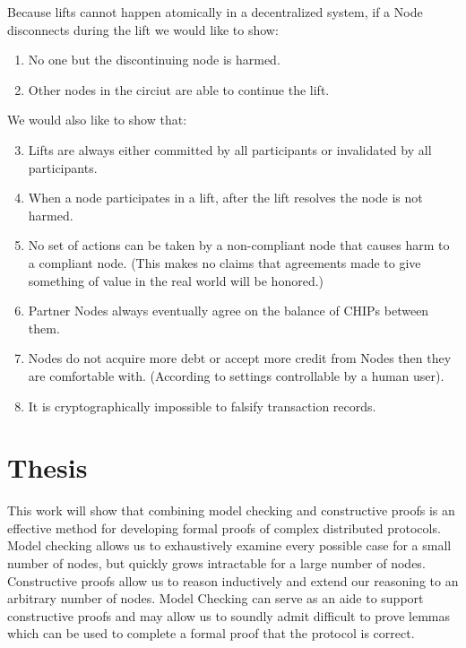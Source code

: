 \documentclass[article, onecolumn, 12pt]{IEEEtran}
\begin{document}
Because lifts cannot happen atomically in a decentralized system, if a Node disconnects during the lift we would like to show: 
\begin{enumerate}
\item No one but the discontinuing node is harmed. 
\item Other nodes in the circiut are able to continue the lift. 
\end{enumerate}
We would also like to show that:
\begin{enumerate}
\setcounter{enumi}{2}
\item Lifts are always either committed by all participants or invalidated by all participants.
\item When a node participates in a lift, after the lift resolves the node is not harmed.

\item No set of actions can be taken by a non-compliant node that causes harm to a compliant node. (This makes no claims that agreements made to give something of value in the real world will be honored.)

\item Partner Nodes always eventually agree on the balance of CHIPs between them.

\item Nodes do not acquire more debt or accept more credit from Nodes then they are comfortable with. (According to settings controllable by a human user).

\item It is cryptographically impossible to falsify transaction records.

\end{enumerate}

\section{Thesis}
This work will show that combining model checking and constructive proofs is an effective method for developing formal proofs of complex distributed protocols. Model checking allows us to exhaustively examine every possible case for a small number of nodes, but quickly grows intractable for a large number of nodes. Constructive proofs allow us to reason inductively and extend our reasoning to an arbitrary number of nodes. Model Checking can serve as an aide to support constructive proofs and may allow us to soundly admit difficult to prove lemmas which can be used to complete a formal proof that the protocol is correct.
\end{document}
